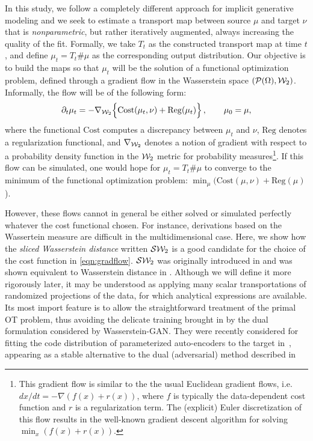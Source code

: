 In this study, we follow a completely different approach for implicit generative modeling and we seek to estimate a transport map between source $\mu$ and target $\nu$ that is \textit{nonparametric}, but rather iteratively augmented, always increasing the quality of the fit. Formally, we take $T_t$ as the constructed transport map at time $t$, and define $\mu_t=T_t \# \mu$ as the corresponding output distribution. Our objective is to build the maps so that $\mu_t$ will be the solution of a functional optimization problem, defined through a gradient flow in the Wasserstein space $({\cal P}(\Omega),{\cal W}_2)$. Informally, the flow will be of the following form:
\begin{align}
\partial_t \mu_t = - \nabla_{{\cal W}_2} \Bigl\{ \mathrm{Cost}(\mu_t, \nu) + \mathrm{Reg}(\mu_t)\Bigr\} \, , \qquad \mu_0 = \mu,\label{eqn:gradflow}
\end{align}
where the functional $\mathrm{Cost}$ computes a discrepancy between $\mu_t$ and $\nu$, $\mathrm{Reg}$ denotes a regularization functional, and $\nabla_{{\cal W}_2}$ denotes a notion of gradient with respect to a probability density function in the ${\cal W}_2$ metric for probability measures\footnote{This gradient flow is similar to the the usual Euclidean gradient flows, i.e.\ $dx/dt = - \nabla (f(x) + r(x))$, where $f$ is typically the data-dependent cost function and $r$ is a regularization term. The (explicit) Euler discretization of this flow results in the well-known gradient descent algorithm for solving $\min_x (f(x)+r(x))$.}. If this flow can be simulated, one would hope for $\mu_t=T_t\#\mu$ to converge to the minimum of the functional optimization problem: $\min_\mu ( \mathrm{Cost}(\mu, \nu) + \mathrm{Reg}(\mu)$).

However, these flows cannot in general be either solved or simulated perfectly whatever the cost functional chosen. For instance, derivations based on the Wassertein measure are difficult in the multidimensional case.  Here, we show how the \textit{sliced Wasserstein distance} written ${\cal S}{\cal W}_2$ is a good candidate for the choice of the cost function in \eqref{eqn:gradflow}. ${\cal S}{\cal W}_2$ was originally introduced in \cite{pitie2005n} and was shown equivalent to Wasserstein distance in \cite{bonnotte2013unidimensional}. Although we will define it more rigorously later, it may be understood as applying many scalar transportations of randomized projections of the data, for which analytical expressions are available. Its most import feature is to allow the straightforward treatment of the primal OT problem, thus avoiding the delicate training brought in by the dual formulation considered by Wasserstein-GAN. They were recently considered for fitting the code distribution of parameterized auto-encoders to the target in~\cite{kolouri2018sliced}, appearing as a stable alternative to the dual (adversarial) method described in~\cite{makhzani2015adversarial}

